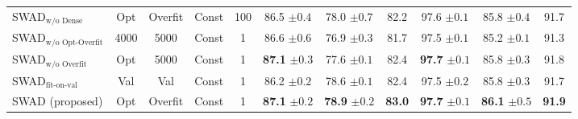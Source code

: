 \begin{table}[h]
\begin{tabular}{@{}l|cccc|ccc|ccc@{}}
SWAD$_\text{w/o Dense}$                & Opt   & Overfit & Const & 100    & 86.5 \scriptsize{$\pm0.4$} & 78.0 \scriptsize{$\pm0.7$} & 82.2        & 97.6 \scriptsize{$\pm0.1$} & 85.8 \scriptsize{$\pm0.4$} & 91.7             \\
SWAD$_\text{w/o Opt-Overfit}$       & 4000  & 5000   & Const & 1     & 86.6 \scriptsize{$\pm0.6$} & 76.9 \scriptsize{$\pm0.3$} & 81.7        & 97.5 \scriptsize{$\pm0.1$} & 85.2 \scriptsize{$\pm0.1$} & 91.3             \\
SWAD$_\text{w/o Overfit}$              & Opt   & 5000   & Const & 1     & \textbf{87.1} \scriptsize{$\pm0.3$} & 77.6 \scriptsize{$\pm0.1$} & 82.4        & \textbf{97.7} \scriptsize{$\pm0.1$} & 85.8 \scriptsize{$\pm0.3$} & 91.8             \\
SWAD$_\text{fit-on-val}$      & Val   & Val     & Const & 1   & 86.2 \scriptsize{$\pm0.2$}         & 78.6 \scriptsize{$\pm0.1$}         & 82.4          & 97.5 \scriptsize{$\pm0.2$}         & 85.8 \scriptsize{$\pm0.3$}         & 91.7           \\
SWAD (proposed)                        & Opt   & Overfit & Const & 1     & \textbf{87.1} \scriptsize{$\pm0.2$} & \textbf{78.9} \scriptsize{$\pm0.2$} & \textbf{83.0}        & \textbf{97.7} \scriptsize{$\pm0.1$} & \textbf{86.1} \scriptsize{$\pm0.5$} & \textbf{91.9}             \\
\bottomrule
\end{tabular}
\label{table:ablation}
\vspace{-0.5em}
\end{table}
